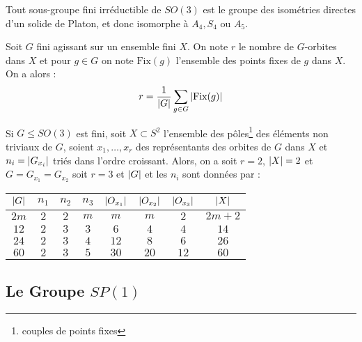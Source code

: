 \documentclass{cours}
\begin{document}
\begin{theorem}[Klein]
    Tout sous-groupe fini irréductible de $SO(3)$ est le groupe des isométries directes d'un solide de Platon, et donc isomorphe à $A_{4}, S_{4}$ ou $A_{5}$.
\end{theorem}

\begin{lemma}
    Soit $G$ fini agissant sur un ensemble fini $X$. On note $r$ le nombre de $G$-orbites dans $X$ et pour $g \in G$ on note $\text{Fix}(g)$ l'ensemble des points fixes de $g$ dans $X$. On a alors :
    \[
        r = \frac{1}{\left|G\right|} \sum_{g \in G}  \left|\text{Fix}(g)\right|
    \]
\end{lemma}

\begin{lemma}
    Si $G \leq SO(3)$ est fini, soit $X \subset S^{2}$ l'ensemble des pôles\footnote{couples de points fixes} des éléments non triviaux de $G$, soient $x_{1}, \ldots, x_{r}$ des représentants des orbites de $G$ dans $X$ et $n_{i} = \left|G_{x_{i}}\right|$ triés dans l'ordre croissant. Alors, on a soit $r = 2$, $\left|X\right| = 2$ et $G = G_{x_{1}} = G_{x_{2}}$ soit $r = 3$ et $\left|G\right|$ et les $n_{i}$ sont données par :
    \begin{center}
        \begin{tabular}{cccccccc}
            $\left|G\right|$ & $n_{1}$ & $n_{2}$ & $n_{3}$ & $\left|O_{x_{1}}\right|$ & $\left|O_{x_{2}}\right|$ & $\left|O_{x_{3}}\right|$ & $\left|X\right|$ \\
            \midrule
            $2m$      & $2$     & $2$     & $m$     & $m$               & $m$               & $2$               & $2m+2$    \\
            \midrule
            $12$      & $2$     & $3$     & $3$     & $6$               & $4$               & $4$               & $14$      \\
            \midrule
            $24$      & $2$     & $3$     & $4$     & $12$              & $8$               & $6$               & $26$      \\
            \midrule
            $60$      & $2$     & $3$     & $5$     & $30$              & $20$              & $12$              & $60$
        \end{tabular}
    \end{center}
\end{lemma}

\subsection{Le Groupe $SP(1)$}
\end{document}
